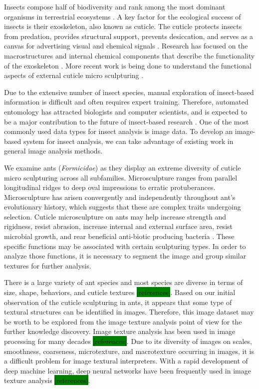 \documentclass{aci}
\numberwithin{equation}{section}
\begin{document}
Insects compose half of biodiversity and rank among the most dominant organisms
in terrestrial ecosystems \cite{sheikh_diverse_2017}. A key factor for the
ecological success of insects is their exoskeleton, also known as cuticle. The
cuticle protects insects from predation, provides structural support, prevents
desiccation, and serves as a canvas for advertising visual and chemical signals
\cite{gullan_insects_2009}. Research has focused on the macrostructures and
internal chemical components that describe the functionality of the exoskeleton
\cite{gunderson_insect_1989}. More recent work is being done to understand the
functional aspects of external cuticle micro sculpturing
\cite{muthukrishnan_insect_2020, watson_diversity_2017}.

Due to the extensive number of insect species, manual exploration of
insect-based information is difficult and often requires expert training.
Therefore, automated entomology has attracted biologists and computer
scientists, and is expected to be a major contribution to the future of
insect-based research \cite{martineau_survey_2017}. One of the most commonly
used data types for insect analysis is image data. To develop an image-based
system for insect analysis, we can take advantage of existing work in general
image analysis methods.

We examine ants (\textit{Formicidae}) as they display an extreme diversity of
cuticle micro sculpturing across all subfamilies. Microsculpture ranges from
parallel longitudinal ridges to deep oval impressions to erratic protuberances.
Microsculpture has arisen convergently and independently throughout ant's
evolutionary history, which suggests  that these are complex traits undergoing
selection. Cuticle microsculpture on ants may help increase strength and
rigidness, resist abrasion, increase internal and external surface area, resist
microbial growth, and rear beneficial anti-biotic producing bacteria
\cite{johnson_effect_2011, bruckner_relationship_2017, currie_coevolved_2006}.
These specific functions may be associated with certain sculpturing types. In
order to analyze those functions, it is necessary to segment the image and group
similar textures for further analysis.

There is a large variety of ant species and most species are diverse in terms of
size, shape, behaviors, and cuticle textures \colorbox{green}{[references]}.
Based on our initial observation of the cuticle sculpturing in ants, it appears
that some type of textural structures can be identified in images. Therefore,
this image dataset may be worth to be explored from the image texture analysis
point of view for the further knowledge discovery. Image texture analysis has
been used in image processing for many decades \colorbox{green}{[references]}. Due to its
diversity of images on scales, smoothness, coarseness, microtexture, and
macrotexture occurring in images, it is a difficult problem for image textural
interpreters. With a rapid development of deep machine learning, deep neural
networks have been frequently used in image texture analysis \colorbox{green}{[references]}.
\end{document}
